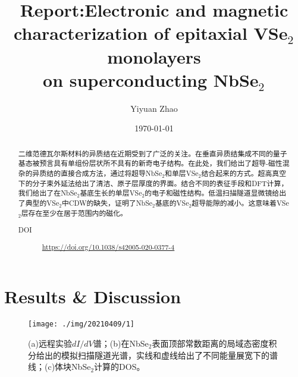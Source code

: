 \documentclass[reprint, aps, prb, showkeys]{revtex4-2}
\begin{document}
\title{Report:Electronic and magnetic characterization of epitaxial VSe$_2$ monolayers\\
 on superconducting NbSe$_2$}

\author{Yiyuan Zhao}
\date{\today}

\begin{abstract}
二维范德瓦尔斯材料的异质结在近期受到了广泛的关注。在垂直异质结集成不同的量子基态被预言具有单组份层状所不具有的新奇电子结构。在此处，我们给出了超导-磁性混杂的异质结的直接合成方法，通过将超导NbSe$_2$和单层VSe$_2$结合起来的方式。超高真空下的分子束外延法给出了清洁、原子层厚度的界面。结合不同的表征手段和DFT计算，我们给出了在NbSe$_2$基底生长的单层VSe$_2$的电子和磁性结构。低温扫描隧道显微镜给出了典型的VSe$_2$中CDW的缺失，证明了NbSe$_2$基底的VSe$_2$超导能隙的减小。这意味着VSe$_2$层存在至少在居于范围内的磁化。
\begin{description}
    \item[DOI] \url{https://doi.org/10.1038/s42005-020-0377-4}
\end{description}
\end{abstract}


\maketitle

\section{Results \& Discussion}
\begin{figure}[t]
    \texttt{[image: ./img/20210409/1]}
    \caption{\label{fig:Electronic} 
    (a)远程实验$dI/dV$谱；(b)在NbSe$_2$表面顶部常数距离的局域态密度积分给出的模拟扫描隧道光谱，实线和虚线给出了不同能量展宽下的谱线；(c)体块NbSe$_2$计算的DOS。
    }
\end{figure}
\end{document}
